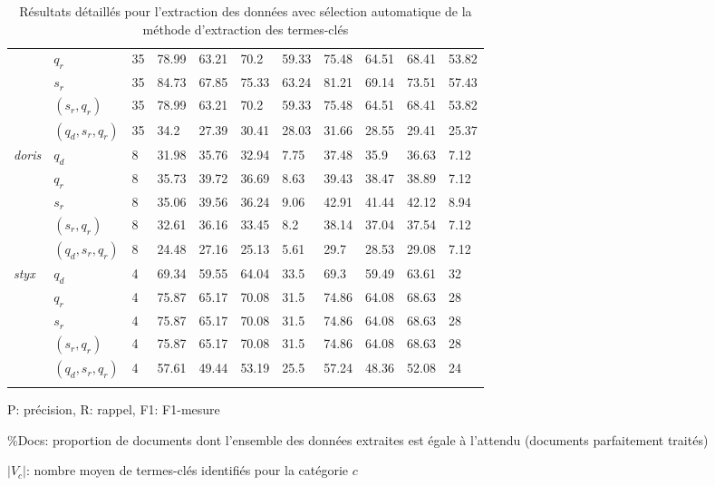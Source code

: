 \begin{table}[!htb]
\begin{tabular}{l|l|l|llll|llll}
		& $q_r$ & 35 & 78.99 & 63.21 & 70.2 & 59.33 & 75.48 & 64.51 & 68.41 & 53.82 \\
		& $s_r$ & 35 & 84.73 & 67.85 & 75.33 & 63.24 & 81.21 & 69.14 & 73.51 & 57.43 \\
		& $(s_r, q_r)$ & 35 & 78.99 & 63.21 & 70.2 & 59.33 & 75.48 & 64.51 & 68.41 & 53.82 \\
		& $(q_d,s_r, q_r)$ & 35 & 34.2 & 27.39 & 30.41 & 28.03 & 31.66 & 28.55 & 29.41 & 25.37 \\ \hline
		\multirow{5}{*}{\textit{doris}}  & $q_d$ & 8 & 31.98 & 35.76 & 32.94 & 7.75 & 37.48 & 35.9 & 36.63 & 7.12 \\
		& $q_r$ & 8 & 35.73 & 39.72 & 36.69 & 8.63 & 39.43 & 38.47 & 38.89 & 7.12 \\
		& $s_r$ & 8 & 35.06 & 39.56 & 36.24 & 9.06 & 42.91 & 41.44 & 42.12 & 8.94 \\
		& $(s_r, q_r)$ & 8 & 32.61 & 36.16 & 33.45 & 8.2 & 38.14 & 37.04 & 37.54 & 7.12 \\
		& $(q_d,s_r, q_r)$ & 8 & 24.48 & 27.16 & 25.13 & 5.61 & 29.7 & 28.53 & 29.08 & 7.12 \\ \hline
		\multirow{5}{*}{\textit{styx}} & $q_d$ & 4 & 69.34 & 59.55 & 64.04 & 33.5 & 69.3 & 59.49 & 63.61 & 32 \\
		& $q_r$ & 4 & 75.87 & 65.17 & 70.08 & 31.5 & 74.86 & 64.08 & 68.63 & 28 \\
		& $s_r$ & 4 & 75.87 & 65.17 & 70.08 & 31.5 & 74.86 & 64.08 & 68.63 & 28 \\
		& $(s_r, q_r)$ & 4 & 75.87 & 65.17 & 70.08 & 31.5 & 74.86 & 64.08 & 68.63 & 28 \\
		& $(q_d,s_r, q_r)$ & 4 & 57.61 & 49.44 & 53.19 & 25.5 & 57.24 & 48.36 & 52.08 & 24  \\
			\hline\noalign{\smallskip}
	\end{tabular}

P: précision, R: rappel, F1: F1-mesure
	
\%Docs: proportion de documents dont l'ensemble des données extraites est égale à l'attendu (documents parfaitement traités)

$\vert V_c \vert$: nombre moyen de termes-clés identifiés pour la catégorie $c$
\caption{Résultats détaillés pour l'extraction des données avec sélection automatique de la méthode d'extraction des termes-clés} \label{tab:quanta:resultDetailExtraction}
\end{table}


